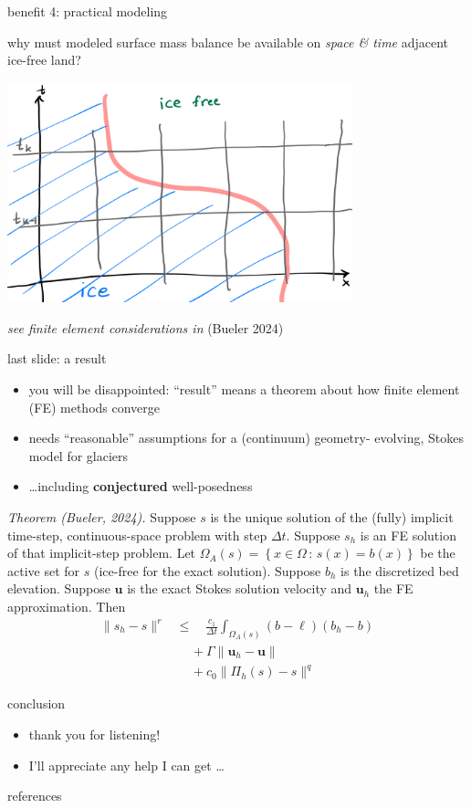 \documentclass[10pt,dvipsnames]{beamer}
\newcommand{\bu}{\mathbf{u}}
\begin{document}
\begin{frame}{benefit 4: practical modeling}

why must modeled surface mass balance be available on \emph{space \& time} adjacent ice-free land?

\bigskip

\begin{center}
\includegraphics[width=0.75\textwidth]{smbcells}
\end{center}

\bigskip
{\color{blue} {\footnotesize \emph{see finite element considerations in} (Bueler 2024)}}
\end{frame}


\begin{frame}{last slide: a result}

\begin{itemize}
\item you will be disappointed: ``result'' means a theorem about how finite element (FE) methods converge
\item needs ``reasonable'' assumptions for a (continuum) geometry- evolving, Stokes model for glaciers
\item \dots including \textbf{conjectured} well-posedness
\end{itemize}

\emph{Theorem (Bueler, 2024).}  Suppose $s$ is the unique solution of the (fully) implicit time-step, continuous-space problem  with step $\Delta t$.  Suppose $s_h$ is an FE solution of that implicit-step problem.  Let $\Omega_A(s) = \left\{x\in\Omega\,:\,s(x)=b(x)\right\}$ be the active set for $s$ (ice-free for the exact solution).  Suppose $b_h$ is the discretized bed elevation.  Suppose $\bu$ is the exact Stokes solution velocity and $\bu_h$ the FE approximation.  Then
\begin{align*}
\|s_h-s\|^r &\le \quad \frac{c_1}{\Delta t} \int_{\Omega_A(s)} (b - \ell) (b_h - b) \\
   &\quad\, + \Gamma \big\|\bu_h - \bu\big\| \\
   &\quad\, + c_0 \|\Pi_h(s) - s\|^q
\end{align*}
\end{frame}


\begin{frame}{conclusion}

\begin{itemize}
\item thank you for listening!
\item I'll appreciate any help I can get \dots
\end{itemize}
\end{frame}


\begin{frame}{references}

{\footnotesize }
\end{frame}
\end{document}

